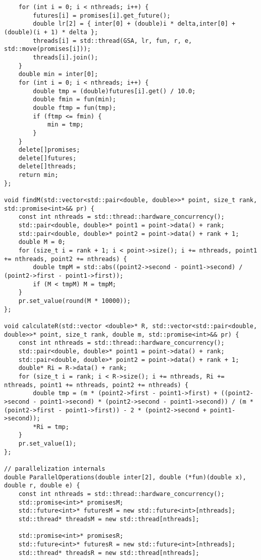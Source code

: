 \documentclass{report}
\begin{document}
\begin{lstlisting}
    for (int i = 0; i < nthreads; i++) {
        futures[i] = promises[i].get_future();
        double lr[2] = { inter[0] + (double)i * delta,inter[0] + (double)(i + 1) * delta };
        threads[i] = std::thread(GSA, lr, fun, r, e, std::move(promises[i]));
        threads[i].join();
    }
    double min = inter[0];
    for (int i = 0; i < nthreads; i++) {
        double tmp = (double)futures[i].get() / 10.0;
        double fmin = fun(min);
        double ftmp = fun(tmp);
        if (ftmp <= fmin) {
            min = tmp;
        }
    }
    delete[]promises;
    delete[]futures;
    delete[]threads;
    return min;
};

void findM(std::vector<std::pair<double, double>>* point, size_t rank, std::promise<int>&& pr) {
    const int nthreads = std::thread::hardware_concurrency();
    std::pair<double, double>* point1 = point->data() + rank;
    std::pair<double, double>* point2 = point->data() + rank + 1;
    double M = 0;
    for (size_t i = rank + 1; i < point->size(); i += nthreads, point1 += nthreads, point2 += nthreads) {
        double tmpM = std::abs((point2->second - point1->second) / (point2->first - point1->first));
        if (M < tmpM) M = tmpM;
    }
    pr.set_value(round(M * 10000));
};

void calculateR(std::vector <double>* R, std::vector<std::pair<double, double>>* point, size_t rank, double m, std::promise<int>&& pr) {
    const int nthreads = std::thread::hardware_concurrency();
    std::pair<double, double>* point1 = point->data() + rank;
    std::pair<double, double>* point2 = point->data() + rank + 1;
    double* Ri = R->data() + rank;
    for (size_t i = rank; i < R->size(); i += nthreads, Ri += nthreads, point1 += nthreads, point2 += nthreads) {
        double tmp = (m * (point2->first - point1->first) + ((point2->second - point1->second) * (point2->second - point1->second)) / (m * (point2->first - point1->first)) - 2 * (point2->second + point1->second));
        *Ri = tmp;
    }
    pr.set_value(1);
};

// parallelization internals
double ParallelOperations(double inter[2], double (*fun)(double x), double r, double e) {
    const int nthreads = std::thread::hardware_concurrency();
    std::promise<int>* promisesM;
    std::future<int>* futuresM = new std::future<int>[nthreads];
    std::thread* threadsM = new std::thread[nthreads];

    std::promise<int>* promisesR;
    std::future<int>* futuresR = new std::future<int>[nthreads];
    std::thread* threadsR = new std::thread[nthreads];


\end{lstlisting}
\end{document}
